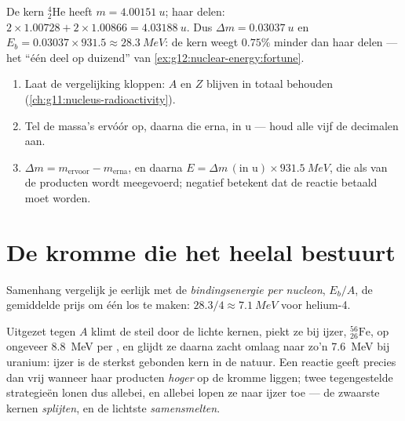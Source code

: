 \begin{example}[Helium-4]\label{ex:g12:nuclear-energy:helium}
De kern ${}^{4}_{2}\mathrm{He}$ heeft $m = \qty{4.00151}{u}$; haar delen:
$2 \times 1.00728 + 2 \times 1.00866 = \qty{4.03188}{u}$. Dus
$\Delta m = \qty{0.03037}{u}$ en $E_b = 0.03037 \times 931.5 \approx
\qty{28.3}{MeV}$: de kern weegt $0.75\%$ minder dan haar delen --- het ``één
deel op duizend'' van \cref{ex:g12:nuclear-energy:fortune}.
\end{example}

\begin{method}\label{met:g12:nuclear-energy:balance}
\begin{enumerate}
  \item Laat de vergelijking kloppen: $A$ en $Z$ blijven in totaal
        behouden (\cref{ch:g11:nucleus-radioactivity}).
  \item Tel de massa's ervóór op, daarna die erna, in \unit{u} --- houd alle
        vijf de decimalen aan.
  \item $\Delta m = m_{\text{ervoor}} - m_{\text{erna}}$, en daarna
        $E = \Delta m\,(\text{in u}) \times \qty{931.5}{MeV}$, die als
         van de producten wordt meegevoerd; negatief betekent
        dat de reactie betaald moet worden.
\end{enumerate}
\end{method}

\section{De kromme die het heelal bestuurt}

\begin{definition}\label{def:g12:nuclear-energy:pernucleon}
Samenhang vergelijk je eerlijk met de \emph{bindingsenergie per
nucleon}, $E_b/A$, de gemiddelde prijs om
één  los te maken: $28.3/4 \approx \qty{7.1}{MeV}$ voor helium-4.
\end{definition}

\begin{proposition}\label{prop:g12:nuclear-energy:ironpeak}
Uitgezet tegen $A$ klimt de  steil door de lichte
kernen, piekt ze bij ijzer, ${}^{56}_{26}\mathrm{Fe}$, op ongeveer
\qty{8.8}{MeV} per , en glijdt ze daarna zacht omlaag naar zo'n
\qty{7.6}{MeV} bij uranium: ijzer is de sterkst gebonden kern in de natuur.
Een reactie geeft precies dan  vrij wanneer haar producten \emph{hoger}
op de kromme liggen; twee tegengestelde strategieën lonen dus allebei, en
allebei lopen ze naar ijzer toe --- de zwaarste kernen \emph{splijten}, en de
lichtste \emph{samensmelten}.
\end{proposition}
\admitted

